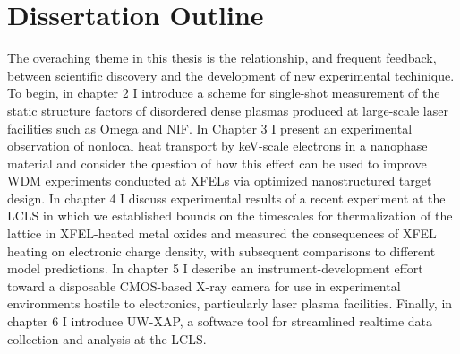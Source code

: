 %





\section{Dissertation Outline}
The overaching theme in this thesis is the relationship, and frequent feedback, between scientific discovery and the development of new experimental techinique. To begin, in chapter 2 I introduce a scheme for single-shot measurement of the static structure factors of disordered dense plasmas produced at large-scale laser facilities such as Omega and NIF. In Chapter 3 I present an experimental observation of nonlocal heat transport by keV-scale electrons in a nanophase material and consider the question of how this effect can be used to improve WDM experiments conducted at XFELs via optimized nanostructured target design. In chapter 4 I discuss experimental results of a recent experiment at the LCLS in which we established bounds on the timescales for thermalization of the lattice in XFEL-heated metal oxides and measured the consequences of XFEL heating on electronic charge density, with subsequent comparisons to different model predictions.  In chapter 5 I describe an instrument-development effort toward a disposable CMOS-based X-ray camera for use in experimental environments hostile to electronics, particularly laser plasma facilities. Finally, in chapter 6 I introduce UW-XAP, a software tool for streamlined realtime data collection and analysis at the LCLS. 



